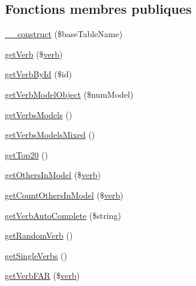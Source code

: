\subsection*{Fonctions membres publiques}
\begin{DoxyCompactItemize}
\item 
\hyperlink{class_conjugation_data_provider_bootstrap_acd6426b902009eb030bafe202f23926c}{\+\_\+\+\_\+construct} (\$base\+Table\+Name)
\item 
\hyperlink{class_conjugation_data_provider_bootstrap_a3e096bba403d060235d1ee9527c7fd6b}{get\+Verb} (\$\hyperlink{teibase_8php_aa8d8fadfcf4239c7aa288414da9d0ace}{verb})
\item 
\hyperlink{class_conjugation_data_provider_bootstrap_ad0fde3743e27eff6e3e5249ca80018b8}{get\+Verb\+By\+Id} (\$id)
\item 
\hyperlink{class_conjugation_data_provider_bootstrap_aec176c34c434c97c34aec9c8b3d058cc}{get\+Verb\+Model\+Object} (\$num\+Model)
\item 
\hyperlink{class_conjugation_data_provider_bootstrap_acd7282af2e4ac1b602656944b0459b97}{get\+Verbs\+Models} ()
\item 
\hyperlink{class_conjugation_data_provider_bootstrap_a059e76472fb3972ebeeaa4060e9c22cf}{get\+Verbs\+Models\+Mixed} ()
\item 
\hyperlink{class_conjugation_data_provider_bootstrap_af959492587f9931545ac2290d722db5a}{get\+Top20} ()
\item 
\hyperlink{class_conjugation_data_provider_bootstrap_a26700071d61691ed0c751f061998cc81}{get\+Others\+In\+Model} (\$\hyperlink{teibase_8php_aa8d8fadfcf4239c7aa288414da9d0ace}{verb})
\item 
\hyperlink{class_conjugation_data_provider_bootstrap_a23b3628d9f1537f4f21c46e362b4cc97}{get\+Count\+Others\+In\+Model} (\$\hyperlink{teibase_8php_aa8d8fadfcf4239c7aa288414da9d0ace}{verb})
\item 
\hyperlink{class_conjugation_data_provider_bootstrap_aa4a5a06e935255e64c39a0ff0584ecec}{get\+Verb\+Auto\+Complete} (\$string)
\item 
\hyperlink{class_conjugation_data_provider_bootstrap_a3a63ae0c2e9cb52190dced76eeaf0c20}{get\+Random\+Verb} ()
\item 
\hyperlink{class_conjugation_data_provider_bootstrap_a6ec1667942d4f6e08d5f5bf083388857}{get\+Single\+Verbs} ()
\item 
\hyperlink{class_conjugation_data_provider_bootstrap_a3d74d3a3a754c871ac93d5a2196184b2}{get\+Verb\+F\+AR} (\$\hyperlink{teibase_8php_aa8d8fadfcf4239c7aa288414da9d0ace}{verb})

\end{DoxyCompactItemize}
